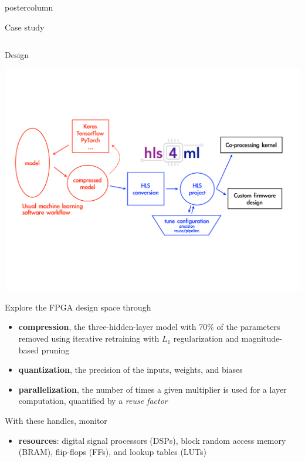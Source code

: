 \documentclass[final,hyperref={pdfpagelabels=false}]{beamer}
\begin{document}
\begin{frame}
\begin{columns}
\begin{column}{.49\textwidth}
\begin{beamercolorbox}[center,wd=\textwidth]{postercolumn}
\begin{minipage}[T]{.95\textwidth}
{\begin{block}{Case study}
\begin{columns}
\begin{column}{.49\textwidth}
                \end{column}
                \end{columns}
              \end{block}
            \begin{block}{Design}
                  \begin{center}
                    \includegraphics[width=\linewidth]{figures/flow-hls4ml.pdf}
                  \end{center}
                \vspace{0.5in}
                Explore the FPGA design space through
                \begin{itemize}
                \item {\bf compression}, the three-hidden-layer model with 70\% of the parameters removed using iterative retraining with $L_1$ regularization and magnitude-based pruning
                \item {\bf quantization}, the precision of the inputs, weights, and biases
                \item {\bf parallelization}, the number of times a
                  given multiplier is used for a layer computation,
                  quantified by a \emph{reuse factor}
                \end{itemize}
                \vspace{0.5in}
                With these handles, monitor 
                \begin{itemize}
                \item {\bf resources}: digital signal processors
                  (DSPs), block random access memory (BRAM), flip-flops (FFs), and lookup tables (LUTs)

\end{itemize}
\end{block}}
\end{minipage}
\end{beamercolorbox}
\end{column}
\end{columns}
\end{frame}
\end{document}
